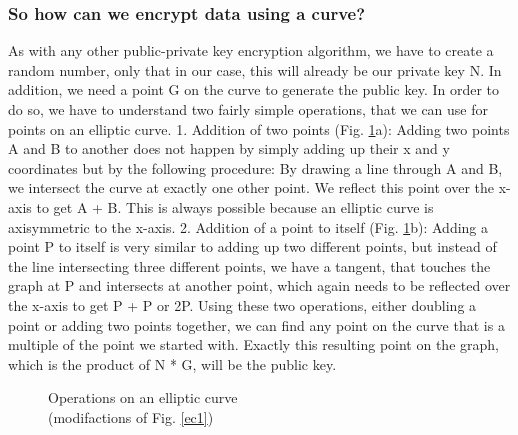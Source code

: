 \subsubsection{So how can we encrypt data using a curve?}
As with any other public-private key encryption algorithm, we have to create a random number, only that in our case, this will already be our private key N. In addition, we need a point G on the curve to generate the public key. In order to do so, we have to understand two fairly simple operations, that we can use for points on an elliptic curve.
1. Addition of two points (Fig. \ref{ec2}a): Adding two points A and B to another does not happen by simply adding up their x and y coordinates but by the following procedure: By drawing a line through A and B, we intersect the curve at exactly one other point. We reflect this point over the x-axis to get A + B. This is always possible because an elliptic curve is axisymmetric to the x-axis.
2. Addition of a point to itself (Fig. \ref{ec2}b): Adding a point P to itself is very similar to adding up two different points, but instead of the line intersecting three different points, we have a tangent, that touches the graph at P and intersects at another point, which again needs to be reflected over the x-axis to get P + P or 2P.
Using these two operations, either doubling a point or adding two points together, we can find any point on the curve that is a multiple of the point we started with. Exactly this resulting point on the graph, which is the product of N * G, will be the public key.

\begin{figure}%
    \centering
    \qquad
\caption{Operations on an elliptic curve \\ (modifactions of Fig. \ref{ec1})}%
\label{ec2}
\end{figure}

